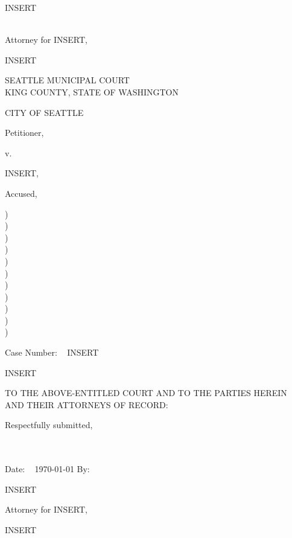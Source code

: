 \documentclass{article}
\newcommand{\tab}{\hspace*{.5in}}
\newenvironment{tightcenter}{%
	\setlength\topsep{0pt}
	\setlength\parskip{0pt}
		\begin{center}
		}{%
		\end{center}
		}
\begin{document}
\begin{singlespace*}

INSERT

~\\

Attorney for INSERT,

INSERT

\end{singlespace*}

\vspace*{18mm}

\begin{tightcenter}
SEATTLE MUNICIPAL COURT \\ KING COUNTY, STATE OF WASHINGTON
\end{tightcenter}

\vspace*{16.25mm}

	{
\begin{minipage}[t]{3in}

CITY OF SEATTLE


\tab \tab \tab Petitioner,

\tab \tab v.

INSERT,

\tab \tab \tab Accused,

\makebox[3in]{\hrulefill}

\end{minipage}
	\begin{minipage}[t]{5mm}
		\begin{singlespace*}
			)\\)\\)\\)\\)\\)\\)\\)\\)\\)\\)
		\end{singlespace*}
	\end{minipage}
\begin{minipage}[t]{3in}

Case Number: ~ INSERT

INSERT


\end{minipage}
	}

\vspace{5mm}

\tab TO THE ABOVE-ENTITLED COURT AND TO THE PARTIES HEREIN AND THEIR ATTORNEYS OF RECORD:


\hspace*{3in}Respectfully submitted,\\

~\\
~\\

\begin{singlespace*}

Date: ~ \today \hspace*{30mm} By: ~ \makebox[3in]{\hrulefill}

\hspace*{3.5in}INSERT

\hspace*{3.5in}Attorney for INSERT,

\hspace*{3.5in}INSERT

\end{singlespace*}
\end{document}
